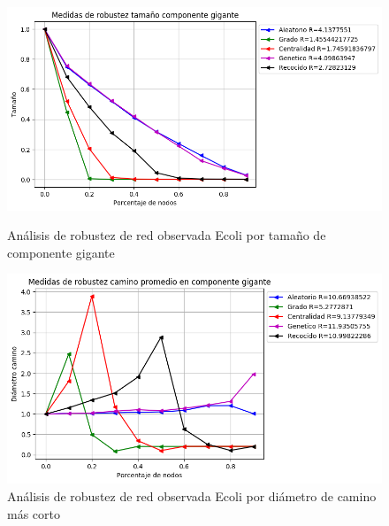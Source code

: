 \begin{figure}[!htb]
    \begin{minipage}{0.48\textwidth}
        \centering
        \includegraphics[scale=0.4]{CapituloAAnexos/imagenesAnexoC/Robustez/grafica_GC20180506_091444EColi}
        \caption{Análisis de robustez de red observada Ecoli por tamaño de componente gigante}
    \end{minipage}\hfill
   \begin{minipage}{0.48\textwidth}
         \centering
       \includegraphics[scale=0.4]{CapituloAAnexos/imagenesAnexoC/Robustez/grafica_APL20180506_091444EColi}
        \caption{Análisis de robustez de red observada Ecoli por diámetro de camino más corto}
    \end{minipage}
\end{figure}


